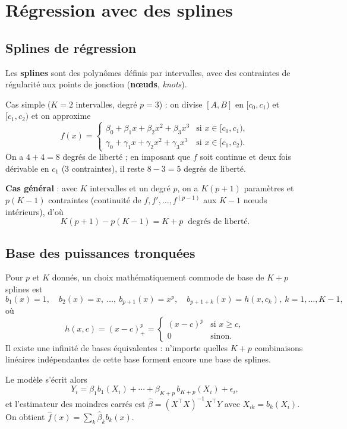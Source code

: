 \documentclass[
  french,
  letterpaper,
  DIV=11,
  numbers=noendperiod]{scrreprt}
\begin{document}
\section{Régression avec des
splines}\label{ruxe9gression-avec-des-splines}

\subsection{Splines de régression}\label{splines-de-ruxe9gression}

Les \textbf{splines} sont des polynômes définis par intervalles, avec
des contraintes de régularité aux points de jonction (\textbf{nœuds},
\emph{knots}).

Cas simple (\(K=2\) intervalles, degré \(p=3\)) : on divise \([A,B]\) en
\([c_0,c_1)\) et \([c_1,c_2)\) et on approxime
\[f(x) = \begin{cases}\beta_0 + \beta_1 x + \beta_2 x^2 + \beta_3 x^3 & \mbox{si } x\in[c_0,c_1),\\ \gamma_0 + \gamma_1 x + \gamma_2 x^2 + \gamma_3 x^3 & \mbox{si } x\in[c_1,c_2).\end{cases}\]
On a \(4+4 = 8\) degrés de liberté ; en imposant que \(f\) soit continue
et deux fois dérivable en \(c_1\) (3 contraintes), il reste \(8-3 = 5\)
degrés de liberté.

\textbf{Cas général} : avec \(K\) intervalles et un degré \(p\), on a
\(K(p+1)\) paramètres et \(p(K-1)\) contraintes (continuité de
\(f, f',\ldots,f^{(p-1)}\) aux \(K-1\) nœuds intérieurs), d'où
\[K(p+1) - p(K-1) = K + p \ \mbox{ degrés de liberté}.\]

\subsection{Base des puissances
tronquées}\label{base-des-puissances-tronquuxe9es}

Pour \(p\) et \(K\) donnés, un choix mathématiquement commode de base de
\(K+p\) splines est
\[b_1(x) = 1,\quad b_2(x) = x,\ \ldots,\ b_{p+1}(x) = x^p,\quad b_{p+1+k}(x) = h(x, c_k),\ k=1,\ldots,K-1,\]
où
\[h(x,c) = (x - c)_+^p = \begin{cases}(x-c)^p & \mbox{si } x\geq c,\\ 0 & \mbox{sinon}.\end{cases}\]
Il existe une infinité de bases équivalentes : n'importe quelles \(K+p\)
combinaisons linéaires indépendantes de cette base forment encore une
base de splines.

Le modèle s'écrit alors
\[Y_i = \beta_1 b_1(X_i) + \cdots + \beta_{K+p}\, b_{K+p}(X_i) + \epsilon_i,\]
et l'estimateur des moindres carrés est
\(\hat\beta = (X^\top X)^{-1}X^\top Y\) avec \(X_{ik} = b_k(X_i)\). On
obtient \(\hat f(x) = \sum_k\hat\beta_k b_k(x)\).
\end{document}
